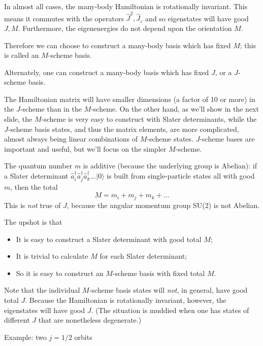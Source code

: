 \documentclass[graybox,sectrefs,envcountresetchap,open=right]{svmonodo}
\begin{document}
In almost all cases, the many-body Hamiltonian is rotationally invariant. This means 
it commutes with the operators $\hat{J}^2, \hat{J}_z$ and so eigenstates will have 
good $J,M$. Furthermore, the eigenenergies do not depend upon the orientation $M$. 


Therefore we can choose to construct a many-body basis which has fixed $M$; this is 
called an $M$-scheme basis. 


Alternately, one can construct a many-body basis which has fixed $J$, or a $J$-scheme 
basis. 

The Hamiltonian matrix will have smaller dimensions (a factor of 10 or more)
 in the $J$-scheme than in the $M$-scheme. 
On the other hand, as we'll show in the next slide, the $M$-scheme is very easy to 
construct with Slater determinants, while the $J$-scheme basis states, and thus the 
matrix elements, are more complicated, almost always being linear combinations of 
$M$-scheme states. $J$-scheme bases are important and useful, but we'll focus on the 
simpler $M$-scheme.



The quantum number $m$ is additive (because the underlying group is Abelian): 
if a Slater determinant $\hat{a}_i^\dagger \hat{a}^\dagger_j \hat{a}^\dagger_k \ldots | 0 \rangle$ 
is built from single-particle states all with good $m$, then the total 
\[
M = m_i + m_j + m_k + \ldots
\]
This is \emph{not} true of $J$, because the angular momentum group SU(2) is not Abelian.

The upshot is that 
\begin{itemize}
\item It is easy to construct a Slater determinant with good total $M$;

\item It is trivial to calculate $M$ for each Slater determinant;

\item So it is easy to construct an $M$-scheme basis with fixed total $M$.
\end{itemize}

\noindent
Note that the individual $M$-scheme basis states will \emph{not}, in general, 
have good total $J$. 
Because the Hamiltonian is rotationally invariant, however, the eigenstates will 
have good $J$. (The situation is muddied when one has states of different $J$ that are 
nonetheless degenerate.) 


Example: two $j=1/2$ orbits
\end{document}
